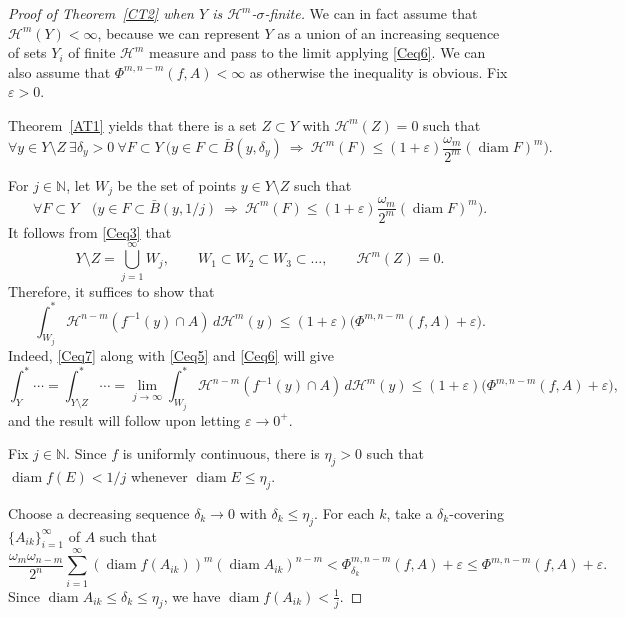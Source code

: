 \documentclass[12pt,leqno]{amsart}
\theoremstyle{definition}
\newcommand{\bbbn}{\mathbb N}
\newcommand{\eps}{\varepsilon}
\def\diam{\operatorname{diam}}
\def\H{{\mathcal H}}
\numberwithin{theorem}{section} \numberwithin{equation}{section}
\begin{document}
\begin{proof}[Proof of {Theorem~\ref{CT2}} when $Y$ is $\H^m$-$\sigma$-finite]
We can in fact assume that $\H^m(Y)<\infty$, because we can represent $Y$ as a union of an increasing sequence of sets $Y_i$ of finite $\H^m$ measure and pass to the limit applying \eqref{Ceq6}.
We can also assume that $\Phi^{m,n-m}(f,A)<\infty$ as otherwise the inequality is obvious.
Fix $\eps>0$.

Theorem~\ref{AT1} yields that there is a set $Z\subset Y$ with $\H^m(Z)=0$ such that
\begin{equation}
\label{Ceq3}
\forall y\in Y\setminus Z\ \exists\delta_y>0\ \forall F\subset Y
\ \Big(y\in F\subset\bar{B}(y,\delta_y)\  \Rightarrow \
\H^m(F)\leq (1+\eps)\frac{\omega_m}{2^m} (\diam F)^m\Big).
\end{equation}

For $j\in\bbbn$, let $W_j$ be the set of points $y\in Y\setminus Z$ such that
$$
\forall F\subset Y
\quad \Big(y\in F\subset\bar{B}(y,1/j)\  \Rightarrow \
\H^m(F)\leq (1+\eps)\frac{\omega_m}{2^m} (\diam F)^m\Big).
$$
It follows from \eqref{Ceq3} that
\begin{equation}
\label{Ceq7}
Y\setminus Z=\bigcup_{j=1}^\infty W_j,
\qquad
W_1\subset W_2\subset W_3\subset\ldots,
\qquad
\H^m(Z)=0.
\end{equation}
Therefore, it suffices to show that
\begin{equation}
\label{Ceq8}
\int_{W_j}^*\H^{n-m}(f^{-1}(y)\cap A)\, d\H^m(y)\leq
(1+\eps)\big(\Phi^{m,n-m}(f,A)+\eps\big).
\end{equation}
Indeed, \eqref{Ceq7} along with \eqref{Ceq5} and \eqref{Ceq6} will give
$$
\int_Y^*\cdots=\int_{Y\setminus Z}^*\cdots=\lim_{j\to\infty}
\int_{W_j}^*\H^{n-m}(f^{-1}(y)\cap A)\, d\H^m(y) \leq
(1+\eps)\big(\Phi^{m,n-m}(f,A)+\eps\big),
$$
and the result will follow upon letting $\eps\to 0^+$.


Fix $j\in\bbbn$. Since $f$ is uniformly continuous, there is
$\eta_j>0$ such that $\diam f(E)<1/j$ whenever $\diam E\leq \eta_j$.

Choose a decreasing sequence $\delta_k\to 0$ with $\delta_k\leq\eta_j$.
For each $k$, take a $\delta_k$-covering $\{A_{ik}\}_{i=1}^\infty$
of $A$ such that
$$
\frac{\omega_m\omega_{n-m}}{2^n}
\sum_{i=1}^\infty
(\diam f(A_{ik}))^m(\diam A_{ik})^{n-m}
<
\Phi^{m,n-m}_{\delta_k}(f,A)+\eps \leq
\Phi^{m,n-m}(f,A)+\eps.
$$
Since $\diam A_{ik}\leq\delta_k\leq\eta_j$, we have $\diam f(A_{ik})<\frac{1}{j}$.


\end{proof}
\end{document}
